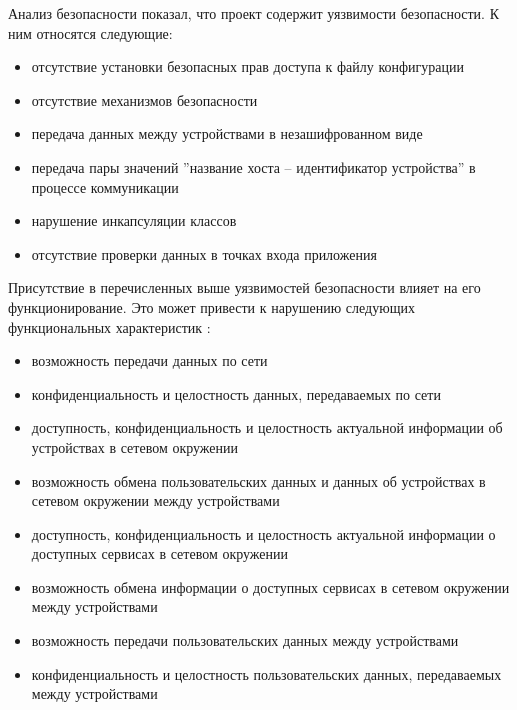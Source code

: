 %
Анализ безопасности  показал, что проект содержит уязвимости безопасности. 
%
К ним относятся следующие:
\begin{itemize}
	\setlength{\itemsep}{0pt}%

	\item отсутствие установки безопасных прав доступа к файлу конфигурации
	\item отсутствие механизмов безопасности
	\item передача данных между устройствами в незашифрованном виде
	\item передача пары значений ''название хоста -- идентификатор устройства'' в процессе коммуникации
	\item нарушение инкапсуляции классов  
	\item отсутствие проверки данных в точках входа приложения
\end{itemize}

%
Присутствие в  перечисленных выше уязвимостей безопасности влияет на его функционирование. 
%
Это может привести к нарушению следующих функциональных характеристик :
\begin{itemize}
	\setlength{\itemsep}{0pt}%

	\item возможность передачи данных по сети
	\item конфиденциальность и целостность данных, передаваемых по сети

	\item доступность, конфиденциальность и целостность актуальной информации об устройствах в сетевом окружении
	\item возможность обмена пользовательских данных и данных об устройствах в сетевом окружении между устройствами

	\item доступность, конфиденциальность и целостность актуальной информации о доступных сервисах в сетевом окружении
	\item возможность обмена информации о доступных сервисах в сетевом окружении между устройствами

	\item возможность передачи пользовательских данных между устройствами
	\item конфиденциальность и целостность пользовательских данных, передаваемых между устройствами
\end{itemize}

